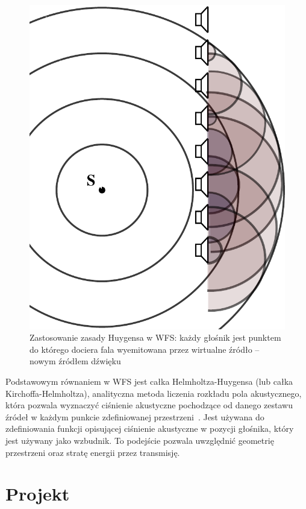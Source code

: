 \documentclass[12pt]{oska}
\let\Oldsection\section
\renewcommand{\section}{\FloatBarrier\Oldsection}
\begin{document}
\begin{figure}[!tbh]
  \centering
  \includegraphics[scale=.4]{vecgraphics/WFS_idea.pdf}
  \caption{Zastosowanie zasady Huygensa w WFS: każdy głośnik jest punktem do
    którego dociera fala wyemitowana przez wirtualne źródło -- nowym źródłem
  dźwięku}
  \label{r:Huygens}
\end{figure}

Podstawowym równaniem w WFS jest całka Helmholtza-Huygensa (lub całka
Kirchoffa-Helmholtza), analityczna metoda liczenia rozkładu pola
akustycznego, która pozwala wyznaczyć ciśnienie akustyczne pochodzące od danego zestawu
źródeł w każdym punkcie zdefiniowanej przestrzeni~\cite{snaka}. Jest używana do
zdefiniowania funkcji opisującej ciśnienie akustyczne w pozycji głośnika, który
jest używany jako wzbudnik. To podejście pozwala uwzględnić geometrię
przestrzeni oraz stratę energii przez transmisję.

\section{Projekt}
\end{document}
